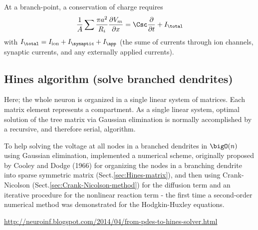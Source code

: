At a branch-point, a conservation of charge requires
\begin{equation}
\frac{1}{A}\sum \frac{\pi a^2}{R_i}\frac{\partial V_m}{\partial x} = \Csc
\frac{\partial }{\partial t} + I_\total
\end{equation}
with $I_\total = I_\ion + I_\synaptic + I_\app$ (the sume of currents through
ion channels, synaptic currents, and any externally applied currents).

\subsection{Hines algorithm (solve branched dendrites)}
\label{sec:model-dendrite-branching-Hines-algorithm}

Here; the whole  neuron is organized in a single linear system of matrices.
Each matrix element represents a compartment. As a single linear system, optimal
solution of the tree matrix via Gaussian elimination is normally  accomplished 
by  a  recursive,  and  therefore serial,  algorithm.

To help solving the voltage at all nodes in a branched dendrites in $\bigO(n)$
using Gaussian elimination, \citep{hines1984} implemented a numerical scheme,
originally proposed by Cooley and Dodge (1966) for organizing the nodes in a
branching dendrite into sparse symmetric matrix (Sect.\ref{sec:Hines-matrix}),
and then using Crank-Nicolson (Sect.\ref{sec:Crank-Nicolson-method}) for the
diffusion term and an iterative procedure for the nonlinear reaction term - the
first time a second-order numerical method was demonstrated for the
Hodgkin-Huxley equations.


\url{http://neuroinf.blogspot.com/2014/04/from-pdes-to-hines-solver.html}

